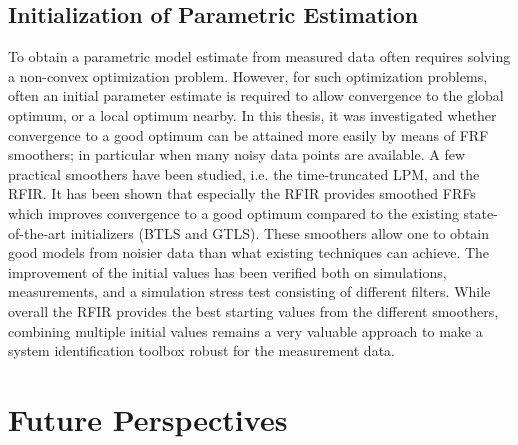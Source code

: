   \subsection{Initialization of Parametric Estimation}
  To obtain a parametric model estimate from measured data often requires solving a non-convex optimization problem.
  However, for such optimization problems, often an initial parameter estimate is required to allow convergence to the global optimum, or a local optimum nearby.
  In this thesis, it was investigated whether convergence to a good optimum can be attained more easily by means of \gls{FRF} smoothers; in particular when many noisy data points are available.
  A few practical smoothers have been studied, i.e. the time-truncated \gls{LPM}, and the \gls{RFIR}.
  It has been shown that especially the \gls{RFIR} provides smoothed \glspl{FRF} which improves convergence to a good optimum compared to the existing state-of-the-art initializers (\gls{BTLS} and \gls{GTLS}).
  These smoothers allow one to obtain good models from noisier data than what existing techniques can achieve.
  The improvement of the initial values has been verified both on simulations, measurements, and a simulation stress test consisting of different filters.
  While overall the \gls{RFIR} provides the best starting values from the different smoothers, combining multiple initial values remains a very valuable approach to make a system identification toolbox robust for the measurement data.

\section{Future Perspectives}
